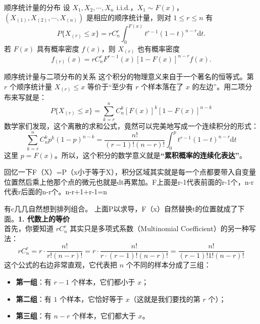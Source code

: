 \begin{theorem}{顺序统计量的分布}
    设 $X_1, X_2, \cdots, X_n$ i.i.d.，$X_1 \sim F(x)$，$(X_{(1)}, X_{(2)}, \cdots, X_{(n)})$ 是相应的顺序统计量，则对 $1 \leqslant r \leqslant n$ 有
    \begin{equation}
        P\{X_{(r)} \leqslant x\} = r C_n^r \int_0^{F(x)} t^{r-1}(1-t)^{n-r} \mathrm{d}t. \tag{2.2.1}
    \end{equation}
    若 $F(x)$ 具有概率密度 $f(x)$，则 $X_{(r)}$ 也有概率密度
    \begin{equation}
        f_{(r)}(x) = r C_n^r F^{r-1}(x)[1 - F(x)]^{n-r} f(x). \tag{2.2.2}
    \end{equation}
\end{theorem}
\begin{note}{顺序统计量与二项分布的关系}
这个积分的物理意义来自于一个著名的恒等式。第 $r$ 个顺序统计量 $X_{(r)} \leqslant x$ 等价于“至少有 $r$ 个样本落在了 $x$ 的左边”。用二项分布来写就是：
$$P\{X_{(r)} \leqslant x\} = \sum_{k=r}^n C_n^k [F(x)]^k [1-F(x)]^{n-k}$$
数学家们发现，这个离散的求和公式，竟然可以完美地写成一个连续积分的形式：
$$\sum_{k=r}^n C_n^k p^k (1-p)^{n-k} = \frac{n!}{(r-1)!(n-r)!} \int_0^p t^{r-1}(1-t)^{n-r} \mathrm{d}t$$
这里 $p = F(x)$。所以，这个积分的数学意义就是\textbf{“累积概率的连续化表达”}。
\end{note}
\begin{dxtips}[学习新公式都要把他拆成几个部分]
    回忆一下F（X）=P（x小于等于X），积分区域其实就是每一个点都要带入自变量位置然后乘上他那个点的微元也就是dt再累加。F上面是r-1代表前面的r-1个，n-r代表r后面的n-r个。n-r+1+r-1=n
\end{dxtips}
\begin{dxtips}
 有c几几自然想到排列组合。   上面P以求导，F（x）自然替换t的位置就成了下面。\textbf{1. 代数上的等价} \\
首先，你要知道 $r C_n^r$ 其实只是多项式系数（Multinomial Coefficient）的另一种写法：
$$r C_n^r = r \cdot \frac{n!}{r!(n-r)!} = r \cdot \frac{n!}{r \cdot (r-1)!(n-r)!} = \frac{n!}{(r-1)! 1! (n-r)!}$$
这个公式的右边非常直观，它代表把 $n$ 个不同的样本分成了三组：
\begin{itemize}
    \item \textbf{第一组}：有 $r-1$ 个样本，它们都小于 $x$；
    \item \textbf{第二组}：有 $1$ 个样本，它恰好等于 $x$（这就是我们要找的第 $r$ 个）；
    \item \textbf{第三组}：有 $n-r$ 个样本，它们都大于 $x$。
\end{itemize}
\end{dxtips}
